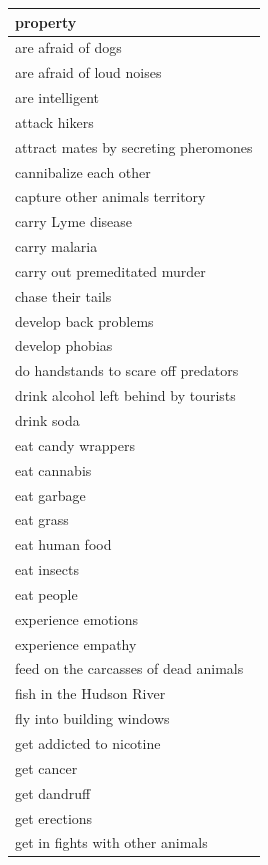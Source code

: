\documentclass[,man,floatsintext]{apa6}
\theoremstyle{definition}
\theoremstyle{definition}
\theoremstyle{definition}
\theoremstyle{remark}
\begin{document}
\begingroup\fontsize{9pt}{10pt}\selectfont
\begin{longtable}{ |p{3in}|}
  \hline
{\bfseries property} \\ 
  \hline
are afraid of dogs \\ 
   \hline
are afraid of loud noises \\ 
   \hline
are intelligent \\ 
   \hline
attack hikers \\ 
   \hline
attract mates by secreting pheromones \\ 
   \hline
cannibalize each other \\ 
   \hline
capture other animals territory \\ 
   \hline
carry Lyme disease \\ 
   \hline
carry malaria \\ 
   \hline
carry out premeditated murder \\ 
   \hline
chase their tails \\ 
   \hline
develop back problems \\ 
   \hline
develop phobias \\ 
   \hline
do handstands to scare off predators \\ 
   \hline
drink alcohol left behind by tourists \\ 
   \hline
drink soda \\ 
   \hline
eat candy wrappers \\ 
   \hline
eat cannabis \\ 
   \hline
eat garbage \\ 
   \hline
eat grass \\ 
   \hline
eat human food \\ 
   \hline
eat insects \\ 
   \hline
eat people \\ 
   \hline
experience emotions \\ 
   \hline
experience empathy \\ 
   \hline
feed on the carcasses of dead animals \\ 
   \hline
fish in the Hudson River \\ 
   \hline
fly into building windows \\ 
   \hline
get addicted to nicotine \\ 
   \hline
get cancer \\ 
   \hline
get dandruff \\ 
   \hline
get erections \\ 
   \hline
get in fights with other animals \\ 

\end{longtable}
\end{document}
